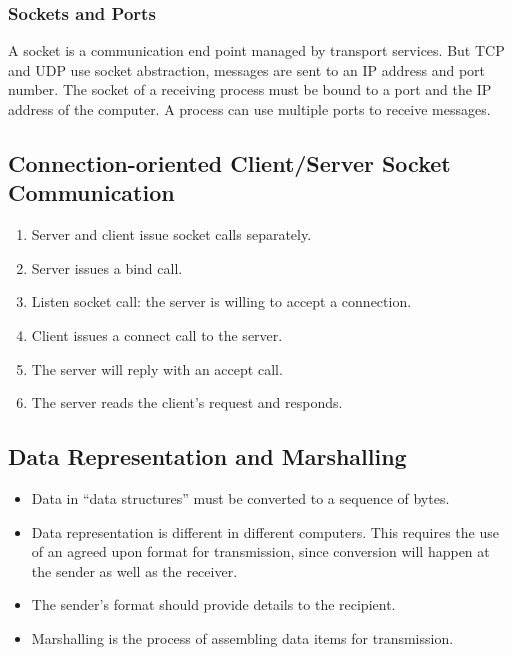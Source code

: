 \documentclass[letterpaper, 12pt]{math}
\begin{document}
\subsubsection*{Sockets and Ports}
A socket is a communication end point managed by transport services. But TCP
and UDP use socket abstraction, messages are sent to an IP address and port
number. The socket of a receiving process must be bound to a port and the IP
address of the computer. A process can use multiple ports to receive messages.

\subsection*{Connection-oriented Client/Server Socket Communication}
\begin{enumerate}
  \item Server and client issue socket calls separately.
  \item Server issues a bind call.
  \item Listen socket call: the server is willing to accept a connection.
  \item Client issues a connect call to the server.
  \item The server will reply with an accept call.
  \item The server reads the client's request and responds.
\end{enumerate}

\subsection*{Data Representation and Marshalling}
\begin{itemize}
  \item Data in ``data structures'' must be converted to a sequence of bytes.
  \item Data representation is different in different computers. This requires
  the use of an agreed upon format for transmission, since conversion will
  happen at the sender as well as the receiver.
  \item The sender's format should provide details to the recipient.
  \item Marshalling is the process of assembling data items for transmission.
\end{itemize}
\end{document}
